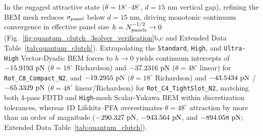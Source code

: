 \documentclass[pdflatex,sn-nature]{sn-jnl}
\begin{document}
In the engaged attractive state ($\theta=18^\circ\text{--}48^\circ$, $d=15\text{ nm}$ vertical gap), refining the BEM mesh reduces $\sigma_{\rm panel}$ below $d=15\text{ nm}$, driving monotonic continuum convergence in effective panel size $h = N_{\rm panels}^{-1/2} \to 0$ (Fig.~\ref{fig:quantum_clutch_3solver_verification}b,c and Extended Data Table~\ref{tab:quantum_clutch}). Extrapolating the \texttt{Standard}, \texttt{High}, and \texttt{Ultra-High} Vector-Dyadic BEM forces to $h \to 0$ yields continuum intercepts of $-15.9193{}\text{ pN}$ ($\theta=18^\circ$ Richardson) and $-37.2316{}\text{ pN}$ ($\theta=48^\circ$ linear) for \texttt{Rot\_C8\_Compact\_N2}, and $-19.2955{}\text{ pN}$ ($\theta=18^\circ$ Richardson) and $-43.5434{}\text{ pN}$ / $-65.3329{}\text{ pN}$ ($\theta=48^\circ$ linear/Richardson) for \texttt{Rot\_C4\_TightSlot\_N2}, matching both 4-pass FDTD and \texttt{High}-mesh Scalar-Yukawa BEM within discretization tolerances, whereas 1D Lifshitz--PFA overestimates $\theta=48^\circ$ attraction by more than an order of magnitude ($-290.327{}\text{ pN}$, $-943.564{}\text{ pN}$, and $-894.058{}\text{ pN}$; Extended Data Table~\ref{tab:quantum_clutch}).
\end{document}
